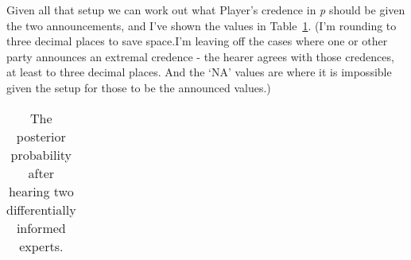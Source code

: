 \documentclass[
  10pt,
  letterpaper,
  DIV=11,
  numbers=noendperiod,
  twoside]{scrartcl}
\begin{document}
Given all that setup we can work out what Player's credence in \emph{p}
should be given the two announcements, and I've shown the values in
Table~\ref{tbl-diffk}. (I'm rounding to three decimal places to save
space.I'm leaving off the cases where one or other party announces an
extremal credence - the hearer agrees with those credences, at least to
three decimal places. And the `NA' values are where it is impossible
given the setup for those to be the announced values.)

\begin{longtable}[]{@{}
  >{\raggedleft\arraybackslash}p{}
  >{\raggedleft\arraybackslash}p{}
  >{\raggedleft\arraybackslash}p{}
  >{\raggedleft\arraybackslash}p{}
  >{\raggedleft\arraybackslash}p{}
  >{\raggedleft\arraybackslash}p{}
  >{\raggedleft\arraybackslash}p{}
  >{\raggedleft\arraybackslash}p{}
  >{\raggedleft\arraybackslash}p{}
  >{\raggedleft\arraybackslash}p{}@{}}

\caption{\label{tbl-diffk}The posterior probability after hearing two
differentially informed experts.}

\tabularnewline


\end{longtable}
\end{document}
